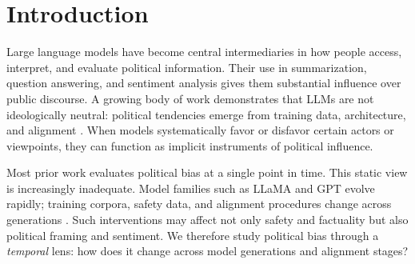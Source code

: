 \maketitle

\begin{abstract}
Large language models (LLMs) increasingly mediate how users access and interpret political information, yet most studies of political bias treat models as static. We study bias as a \emph{temporal} phenomenon using Prediction Inconsistency (IC) and sentiment label distributions on target-oriented classification. We evaluate two families---OpenAI ChatGPT (gpt-3.5-turbo through gpt-4o) and Meta Llama~3.2 (Base and Instruct, 1B--11B)---on fixed entities and templates. For ChatGPT, IC rises from near zero (gpt-3.5-turbo) to $\approx$0.67 (gpt-4) and plateaus at $\approx$0.61 for later variants; labels shift from 100\% positive to a mix of positive and UNKNOWN. For Llama, IC is lower (0.005--0.178); instruction tuning sharply reduces IC for 1B and yields minimal inconsistency for the 11B vision model. We show that political bias, as captured by IC and label distribution, evolves with model family, version, and alignment, and argue for longitudinal evaluation in bias research.
\end{abstract}

\section{Introduction}

Large language models have become central intermediaries in how people access, interpret, and evaluate political information. Their use in summarization, question answering, and sentiment analysis gives them substantial influence over public discourse. A growing body of work demonstrates that LLMs are not ideologically neutral: political tendencies emerge from training data, architecture, and alignment \citep{santurkar2023,buyl2026,hartmann2023,bang2024}. When models systematically favor or disfavor certain actors or viewpoints, they can function as implicit instruments of political influence.

Most prior work evaluates political bias at a single point in time. This static view is increasingly inadequate. Model families such as LLaMA and GPT evolve rapidly; training corpora, safety data, and alignment procedures change across generations \citep{touvron2023,dubey2024}. Such interventions may affect not only safety and factuality but also political framing and sentiment. We therefore study political bias through a \emph{temporal} lens: how does it change across model generations and alignment stages?

